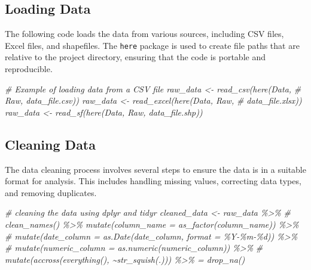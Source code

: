 \documentclass[
  12pt,
]{article}
\newenvironment{Shaded}{\begin{snugshade}}{\end{snugshade}}
\newcommand{\CommentTok}[1]{\textcolor[rgb]{0.56,0.35,0.01}{\textit{#1}}}
\begin{document}
\subsection{Loading Data}\label{loading-data}

The following code loads the data from various sources, including CSV
files, Excel files, and shapefiles. The \texttt{here} package is used to
create file paths that are relative to the project directory, ensuring
that the code is portable and reproducible.

\begin{Shaded}
\begin{Highlighting}[]
\CommentTok{\# Example of loading data from a CSV file raw\_data \textless{}{-} read\_csv(here(\textquotesingle{}Data\textquotesingle{},}
\CommentTok{\# \textquotesingle{}Raw\textquotesingle{}, \textquotesingle{}data\_file.csv\textquotesingle{})) raw\_data \textless{}{-} read\_excel(here(\textquotesingle{}Data\textquotesingle{}, \textquotesingle{}Raw\textquotesingle{},}
\CommentTok{\# \textquotesingle{}data\_file.xlsx\textquotesingle{})) raw\_data \textless{}{-} read\_sf(here(\textquotesingle{}Data\textquotesingle{}, \textquotesingle{}Raw\textquotesingle{}, \textquotesingle{}data\_file.shp\textquotesingle{}))}
\end{Highlighting}
\end{Shaded}

\subsection{Cleaning Data}\label{cleaning-data}

The data cleaning process involves several steps to ensure the data is
in a suitable format for analysis. This includes handling missing
values, correcting data types, and removing duplicates.

\begin{Shaded}
\begin{Highlighting}[]
\CommentTok{\# cleaning the data using dplyr and tidyr cleaned\_data \textless{}{-} raw\_data \%\textgreater{}\%}
\CommentTok{\# clean\_names() \%\textgreater{}\% mutate(column\_name = as\_factor(column\_name)) \%\textgreater{}\%}
\CommentTok{\# mutate(date\_column = as.Date(date\_column, format = \textquotesingle{}\%Y{-}\%m{-}\%d\textquotesingle{})) \%\textgreater{}\%}
\CommentTok{\# mutate(numeric\_column = as.numeric(numeric\_column)) \%\textgreater{}\%}
\CommentTok{\# mutate(accross(everything(), \textasciitilde{}str\_squish(.))) \%\textgreater{}\% = drop\_na()}
\end{Highlighting}
\end{Shaded}
\end{document}
